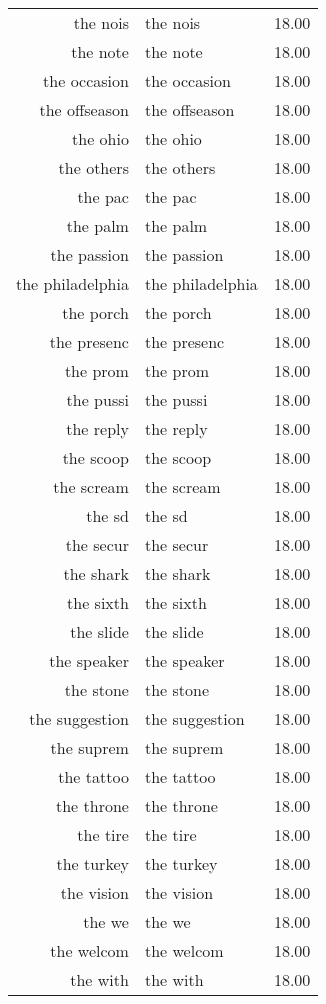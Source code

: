 \begin{table}[ht]
\begin{tabular}{rlr}
  the nois & the nois & 18.00 \\ 
  the note & the note & 18.00 \\ 
  the occasion & the occasion & 18.00 \\ 
  the offseason & the offseason & 18.00 \\ 
  the ohio & the ohio & 18.00 \\ 
  the others & the others & 18.00 \\ 
  the pac & the pac & 18.00 \\ 
  the palm & the palm & 18.00 \\ 
  the passion & the passion & 18.00 \\ 
  the philadelphia & the philadelphia & 18.00 \\ 
  the porch & the porch & 18.00 \\ 
  the presenc & the presenc & 18.00 \\ 
  the prom & the prom & 18.00 \\ 
  the pussi & the pussi & 18.00 \\ 
  the reply & the reply & 18.00 \\ 
  the scoop & the scoop & 18.00 \\ 
  the scream & the scream & 18.00 \\ 
  the sd & the sd & 18.00 \\ 
  the secur & the secur & 18.00 \\ 
  the shark & the shark & 18.00 \\ 
  the sixth & the sixth & 18.00 \\ 
  the slide & the slide & 18.00 \\ 
  the speaker & the speaker & 18.00 \\ 
  the stone & the stone & 18.00 \\ 
  the suggestion & the suggestion & 18.00 \\ 
  the suprem & the suprem & 18.00 \\ 
  the tattoo & the tattoo & 18.00 \\ 
  the throne & the throne & 18.00 \\ 
  the tire & the tire & 18.00 \\ 
  the turkey & the turkey & 18.00 \\ 
  the vision & the vision & 18.00 \\ 
  the we & the we & 18.00 \\ 
  the welcom & the welcom & 18.00 \\ 
  the with & the with & 18.00 \\ 

\end{tabular}
\end{table}
